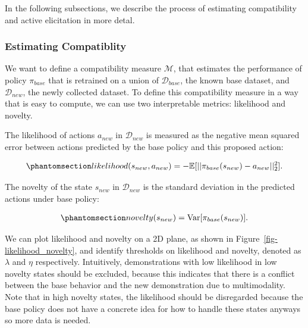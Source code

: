 \documentclass[
  letterpaper,
  numbers=noenddot,
  DIV=11]{scrreprt}
\theoremstyle{definition}
\theoremstyle{plain}
\theoremstyle{plain}
\theoremstyle{remark}
\begin{document}
In the following subsections, we describe the process of estimating
compatibility and active elicitation in more detal.

\subsubsection*{Estimating Compatiblity}\label{estimating-compatiblity}

We want to define a compatibility measure \(\mathcal{M}\), that
estimates the performance of policy \(\pi_{base}\) that is retrained on
a union of \(\mathcal{D}_{base}\), the known base dataset, and
\(\mathcal{D}_{new}\), the newly collected dataset. To define this
compatibility measure in a way that is easy to compute, we can use two
interpretable metrics: likelihood and novelty.

The likelihood of actions \(a_{new}\) in \(\mathcal{D}_{new}\) is
measured as the negative mean squared error between actions predicted by
the base policy and this proposed action:

\begin{equation}\phantomsection\label{eq-eq3.61}{\begin{aligned}
    likelihood(s_{new}, a_{new}) = -\mathbb{E}[|| \pi_{base}(s_{new}) - a_{new} ||^2_2].
\end{aligned}}\end{equation}

The novelty of the state \(s_{new}\) in \(\mathcal{D}_{new}\) is the
standard deviation in the predicted actions under base policy:

\begin{equation}\phantomsection\label{eq-eq3.62}{\begin{aligned}
    novelty(s_{new}) = \mathrm{Var}[\pi_{base}(s_{new})].
\end{aligned}}\end{equation}

We can plot likelihood and novelty on a 2D plane, as shown in
Figure~\ref{fig-likelihood_novelty}, and identify thresholds on
likelihood and novelty, denoted as \(\lambda\) and \(\eta\)
respectively. Intuitively, demonstrations with low likelihood in low
novelty states should be excluded, because this indicates that there is
a conflict between the base behavior and the new demonstration due to
multimodality. Note that in high novelty states, the likelihood should
be disregarded because the base policy does not have a concrete idea for
how to handle these states anyways so more data is needed.
\end{document}
